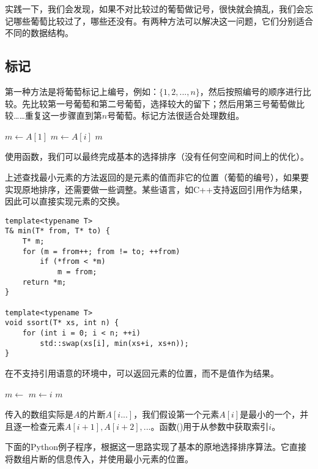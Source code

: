 \documentclass{ctexart}
\begin{document}
实践一下，我们会发现，如果不对比较过的葡萄做记号，很快就会搞乱，我们会忘记哪些葡萄比较过了，哪些还没有。有两种方法可以解决这一问题，它们分别适合不同的数据结构。

\subsection{标记}
第一种方法是将葡萄标记上编号，例如：$\{1, 2, ..., n\}$，然后按照编号的顺序进行比较。先比较第一号葡萄和第二号葡萄，选择较大的留下；然后用第三号葡萄做比较……重复这一步骤直到第$n$号葡萄。标记方法很适合处理数组。

\begin{algorithmic}[1]
  \State $m \gets A[1]$
      \State $m \gets A[i]$
    \EndIf
  \EndFor
  \State \Return $m$
\EndFunction
\end{algorithmic}

使用函数，我们可以最终完成基本的选择排序（没有任何空间和时间上的优化）。

上述查找最小元素的方法返回的是元素的值而非它的位置（葡萄的编号），如果要实现原地排序，还需要做一些调整。某些语言，如C++支持返回引用作为结果，因此可以直接实现元素的交换。

\lstset{language=C++}
\begin{lstlisting}
template<typename T>
T& min(T* from, T* to) {
    T* m;
    for (m = from++; from != to; ++from)
        if (*from < *m)
            m = from;
    return *m;
}

template<typename T>
void ssort(T* xs, int n) {
    for (int i = 0; i < n; ++i)
        std::swap(xs[i], min(xs+i, xs+n));
}
\end{lstlisting}

在不支持引用语意的环境中，可以返回元素的位置，而不是值作为结果。

\begin{algorithmic}[1]
  \State $m \gets$ 
      \State $m \gets i$
    \EndIf
  \EndFor
  \State \Return $m$
\EndFunction
\end{algorithmic}

传入的数组实际是$A$的片断$A[i...]$，我们假设第一个元素$A[i]$是最小的一个，并且逐一检查元素$A[i+1], A[i+2], ...$。函数()用于从参数中获取索引$i$。

下面的Python例子程序，根据这一思路实现了基本的原地选择排序算法。它直接将数组片断的信息传入，并使用最小元素的位置。
\end{document}
